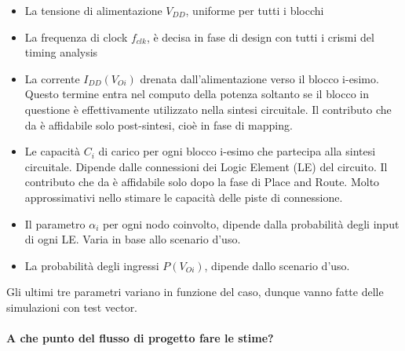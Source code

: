 \documentclass{book}
\begin{document}
        \begin{itemize}
            \item La tensione di alimentazione $V_{DD}$, uniforme per tutti i blocchi 
            \item La frequenza di clock $f_{clk}$, è decisa in fase di design con tutti i crismi del timing analysis 
            \item La corrente $I_{DD}(V_{Oi})$ drenata dall'alimentazione verso il blocco i-esimo. Questo
            termine entra nel computo della potenza soltanto se il blocco in questione è effettivamente utilizzato
            nella sintesi circuitale. Il contributo che da è affidabile solo post-sintesi, cioè in fase di mapping. 
            \item Le capacità $C_{i}$ di carico per ogni blocco i-esimo che partecipa alla sintesi circuitale. Dipende 
            dalle connessioni dei Logic Element (LE) del circuito. Il contributo che da è affidabile solo dopo la 
            fase di Place and Route. Molto approssimativi nello stimare le capacità delle piste di connessione.
            \item Il parametro $\alpha_{i}$ per ogni nodo coinvolto, dipende dalla probabilità degli input di ogni LE. Varia 
            in base allo scenario d'uso.
            \item La probabilità degli ingressi $P(V_{Oi})$, dipende dallo scenario d'uso.
        \end{itemize}
        Gli ultimi tre parametri variano in funzione del caso, dunque vanno fatte delle simulazioni con test vector.
        \\ \\
        \textbf{A che punto del flusso di progetto fare le stime?} 
\end{document}
